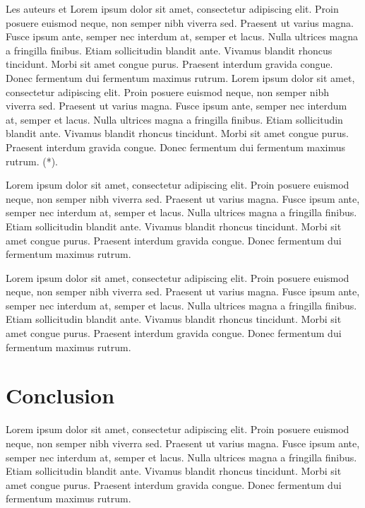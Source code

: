 \medskip

Les auteurs \parencite{liu_hybridization_2014} et \parencite{cacchiani_set-covering_2014} Lorem ipsum dolor sit amet, consectetur adipiscing elit. Proin posuere euismod neque, non semper nibh viverra sed. Praesent ut varius magna. Fusce ipsum ante, semper nec interdum at, semper et lacus. Nulla ultrices magna a fringilla finibus. Etiam sollicitudin blandit ante. Vivamus blandit rhoncus tincidunt. Morbi sit amet congue purus. Praesent interdum gravida congue. Donec fermentum dui fermentum maximus rutrum. \parencite{chao_new_1995} Lorem ipsum dolor sit amet, consectetur adipiscing elit. Proin posuere euismod neque, non semper nibh viverra sed. Praesent ut varius magna. Fusce ipsum ante, semper nec interdum at, semper et lacus. Nulla ultrices magna a fringilla finibus. Etiam sollicitudin blandit ante. Vivamus blandit rhoncus tincidunt. Morbi sit amet congue purus. Praesent interdum gravida congue. Donec fermentum dui fermentum maximus rutrum. (*).

\medskip

Lorem ipsum dolor sit amet, consectetur adipiscing elit. Proin posuere euismod neque, non semper nibh viverra sed. Praesent ut varius magna. Fusce ipsum ante, semper nec interdum at, semper et lacus. Nulla ultrices magna a fringilla finibus. Etiam sollicitudin blandit ante. Vivamus blandit rhoncus tincidunt. Morbi sit amet congue purus. Praesent interdum gravida congue. Donec fermentum dui fermentum maximus rutrum.

\medskip

Lorem ipsum dolor sit amet, consectetur adipiscing elit. Proin posuere euismod neque, non semper nibh viverra sed. Praesent ut varius magna. Fusce ipsum ante, semper nec interdum at, semper et lacus. Nulla ultrices magna a fringilla finibus. Etiam sollicitudin blandit ante. Vivamus blandit rhoncus tincidunt. Morbi sit amet congue purus. Praesent interdum gravida congue. Donec fermentum dui fermentum maximus rutrum.

\medskip

\section{Conclusion}

Lorem ipsum dolor sit amet, consectetur adipiscing elit. Proin posuere euismod neque, non semper nibh viverra sed. Praesent ut varius magna. Fusce ipsum ante, semper nec interdum at, semper et lacus. Nulla ultrices magna a fringilla finibus. Etiam sollicitudin blandit ante. Vivamus blandit rhoncus tincidunt. Morbi sit amet congue purus. Praesent interdum gravida congue. Donec fermentum dui fermentum maximus rutrum.


